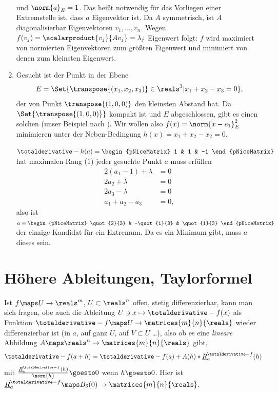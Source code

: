 \begin{beispiele*}
\begin{enumerate}
\begin{align*}
    \end{align*}
    und \( \norm{a}_E=1 \). Das heißt notwendig für das Vorliegen einer Extremstelle ist, dass \( a \) Eigenvektor ist. Da \( A \) symmetrisch, ist \( A \) diagonalisierbar \timplies \texists  Eigenvektoren \( v_1,\dotsc, v_n \). Wegen \( f(v_j)=\scalarproduct{v_j}{A v_j}=\lambda_j \) Eigenwert folgt: \( f \) wird maximiert von normierten Eigenvektoren zum größten Eigenwert und minimiert von denen zum kleinsten Eigenwert.
    \item Gesucht ist der Punkt in der Ebene
    \begin{equation*}
      E=\Set{\transpose{(x_1,x_2,x_3)}\in \reals^3|x_1+x_2-x_3=0},
    \end{equation*}
    der von Punkt \( \transpose{(1,0,0)} \) den kleinsten Abstand hat. Da \( \Set{\transpose{(1,0,0)}} \) kompakt ist und \( E \) abgeschlossen, gibt es einen solchen (\vgl unser Beispiel nach ). Wir wollen also \( f(x)=\norm{x-e_1}_E^2 \) minimieren unter der Neben-Bedingung \( h(x)=x_1+x_2-x_2=0 \).

    \( \totalderivative-{h}(a)=\begin{pNiceMatrix} 1 & 1 & -1 \end{pNiceMatrix} \) hat maximalen Rang (\( 1 \)) \dh jeder gesuchte Punkt \( a  \) muss erfüllen
      \begin{align*}
        2(a_1-1)+\lambda&=0\\
        2a_2+\lambda&=0\\
        2a_3-\lambda&=0\\
        a_1+a_2-a_3&=0,
      \end{align*}
    also ist \( a=\begin{pNiceMatrix} \quot{2}{3} & -\quot{1}{3} & \quot{1}{3} \end{pNiceMatrix} \) der einzige Kandidat für ein Extremum. Da es ein Minimum gibt, muss \( a \) dieses sein.
    \end{enumerate}
\end{beispiele*}
\section*{Höhere Ableitungen, Taylorformel}
Ist \( f\maps U\to \reals^m \), \( U\subset \reals^n \) offen, stetig differenzierbar, kann man sich fragen, obe auch die Ableitung \( U\ni x\mapsto \totalderivative-{f}(x) \) als Funktion \( \totalderivative-{f}\maps U\to \matrices{m}{n}{\reals} \) wieder differenzierbar ist (in \( a \), auf ganz \( U \), auf \( V\subset U \) \dots), also ob es eine \emph{lineare} Abbildung \( A\maps \reals^n\to \matrices{m}{n}{\reals} \) gibt, \sd 
\begin{equation*}
  \totalderivative-{f}(a+h)=\totalderivative-{f}(a)+A(h)*\underline{R}_a^{\totalderivative-{f}}(h)
\end{equation*}
mit \( \frac{\underline{R}_a^{\totalderivative-{f}}(h)}{\norm{h}}\goesto 0 \) wenn \( h\goesto 0 \). Hier ist \( \underline{R}_a^{\totalderivative-{f}}\maps B_{\delta}(0)\to \matrices{m}{n}{\reals} \). 

